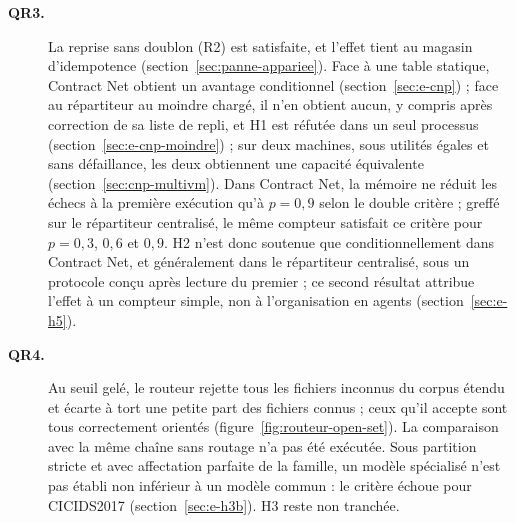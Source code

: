 \begin{description}
    \item[\textbf{QR3.}]
    La reprise sans doublon (R2) est satisfaite, et l'effet tient au magasin d'idempotence (section~\ref{sec:panne-appariee}). Face à une table statique, Contract Net obtient un avantage conditionnel (section~\ref{sec:e-cnp}) ; face au répartiteur au moindre chargé, il n'en obtient aucun, y compris après correction de sa liste de repli, et H1 est réfutée dans un seul processus (section~\ref{sec:e-cnp-moindre}) ; sur deux machines, sous utilités égales et sans défaillance, les deux obtiennent une capacité équivalente (section~\ref{sec:cnp-multivm}). Dans Contract Net, la mémoire ne réduit les échecs à la première exécution qu'à $p=0{,}9$ selon le double critère ; greffé sur le répartiteur centralisé, le même compteur satisfait ce critère pour $p=0{,}3$, $0{,}6$ et $0{,}9$. H2 n'est donc soutenue que conditionnellement dans Contract Net, et généralement dans le répartiteur centralisé, sous un protocole conçu après lecture du premier ; ce second résultat attribue l'effet à un compteur simple, non à l'organisation en agents (section~\ref{sec:e-h5}).

    \item[\textbf{QR4.}]
    Au seuil gelé, le routeur rejette tous les fichiers inconnus du corpus étendu et écarte à tort une petite part des fichiers connus ; ceux qu'il accepte sont tous correctement orientés (figure~\ref{fig:routeur-open-set}). La comparaison avec la même chaîne sans routage n'a pas été exécutée. Sous partition stricte et avec affectation parfaite de la famille, un modèle spécialisé n'est pas établi non inférieur à un modèle commun : le critère échoue pour CICIDS2017 (section~\ref{sec:e-h3b}). H3 reste non tranchée.


\end{description}
